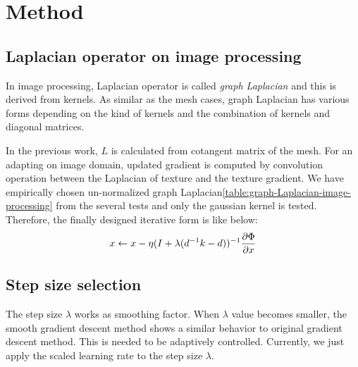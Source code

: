 \section*{Method}\label{ch:ch3label}

\subsection*{Laplacian operator on image processing}
In image processing, Laplacian operator is called \emph{graph Laplacian} and this is derived from kernels. As similar as the mesh cases, graph Laplacian has various forms depending on the kind of kernels\cite{milanfar2012tour} and the combination of kernels and diagonal matrices.

\begin{table}[!h]
	\centering
	\caption{graph Laplacian in image processing}
	\label{table:graph-Laplacian-image-processing}
\end{table}

In the previous work\cite{Nicolet2021Large}, $L$ is calculated from cotangent matrix of the mesh. For an adapting on image domain, updated gradient is computed by convolution operation between the Laplacian of texture and the texture gradient. We have empirically chosen un-normalized graph Laplacian\ref{table:graph-Laplacian-image-processing} from the several tests and only the gaussian kernel is tested. Therefore, the finally designed iterative form is like below:
\begin{align}{\label{eq}}
	x \leftarrow x - \eta (I + \lambda (d^{-1}k-d))^{-1} {\frac{\partial \Phi}{\partial x}}
\end{align}

\subsection*{Step size selection}

The step size $\lambda$ works as smoothing factor. When $\lambda$ value becomes smaller, the smooth gradient descent method shows a similar behavior to original gradient descent method. This is needed to be adaptively controlled. Currently, we just apply the scaled learning rate to the step size $\lambda$.


